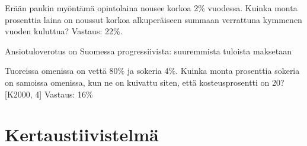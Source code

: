 Erään pankin myöntämä opintolaina nousee korkoa 2\% vuodessa. Kuinka monta prosenttia laina on noussut korkoa alkuperäiseen summaan verrattuna kymmenen vuoden kuluttua?
Vastaus: 22\%.

Ansiotuloverotus on Suomessa progressiivista: suuremmista tuloista maksetaan

Tuoreissa omenissa on vettä 80\% ja sokeria 4\%. Kuinka monta prosenttia sokeria on samoissa omenissa, kun ne on kuivattu siten, että kosteusprosentti on 20? [K2000, 4]
Vastaus: 16\%

%
%
\chapter{Kertaustiivistelmä}

